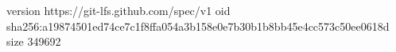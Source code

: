version https://git-lfs.github.com/spec/v1
oid sha256:a19874501ed74ce7c1f8ffa054a3b158e0e7b30b1b8bb45e4cc573c50ee0618d
size 349692
